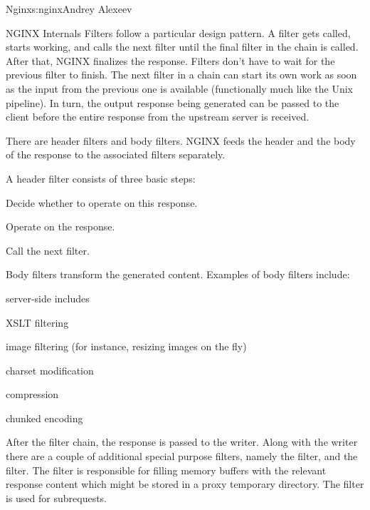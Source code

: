 \begin{aosachapter}{Nginx}{s:nginx}{Andrey Alexeev}
\begin{aosasect1}{NGINX Internals}
Filters follow a particular design pattern. A filter gets called,
starts working, and calls the next filter until the final filter in
the chain is called. After that, NGINX finalizes the response. Filters
don't have to wait for the previous filter to finish. The next filter
in a chain can start its own work as soon as the input from the
previous one is available (functionally much like the Unix
pipeline). In turn, the output response being generated can be passed
to the client before the entire response from the upstream server is
received.

There are header filters and body filters. NGINX feeds the header and
the body of the response to the associated filters separately.

A header filter consists of three basic steps:

\begin{aosaenumerate}

\item Decide whether to operate on this response.

\item Operate on the response.

\item Call the next filter.

\end{aosaenumerate}

Body filters transform the generated content. Examples of body filters
include:

\begin{aosaitemize}

\item server-side includes

\item XSLT filtering

\item image filtering (for instance, resizing images on the fly)

\item charset modification

\item {} compression

\item chunked encoding

\end{aosaitemize}

After the filter chain, the response is passed to the writer. Along
with the writer there are a couple of additional special purpose
filters, namely the  filter, and the 
filter. The  filter is responsible for filling memory
buffers with the relevant response content which might be stored in a
proxy temporary directory. The  filter is used for
subrequests.


\end{aosasect1}
\end{aosachapter}

